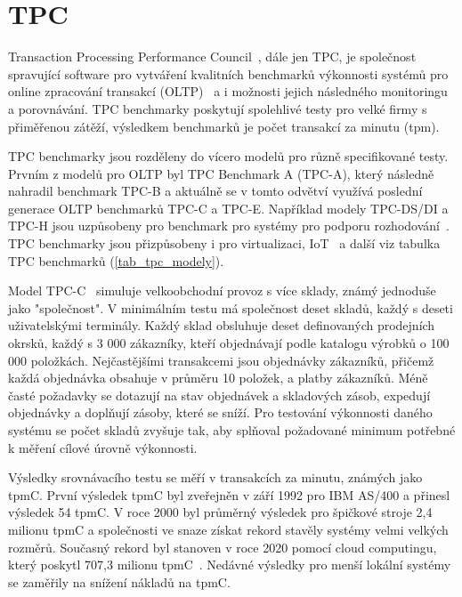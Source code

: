 \documentclass[czech,master,dept460,male,csharp,cpdeclaration]{diploma}
\begin{document}
	\section{TPC}
	
	Transaction Processing Performance Council~\cite{tpc}, dále jen TPC, je společnost spravující software pro vytváření kvalitních benchmarků výkonnosti systémů pro online zpracování transakcí (OLTP)~\cite{oltp} a i možnosti jejich následného monitoringu a porovnávání. TPC benchmarky poskytují spolehlivé testy pro velké firmy s přiměřenou zátěží, výsledkem benchmarků je počet transakcí za minutu (tpm).
	
	TPC benchmarky jsou rozděleny do vícero modelů pro různě specifikované testy. Prvním z modelů pro OLTP byl TPC Benchmark A (TPC-A), který následně nahradil benchmark TPC-B a aktuálně se v tomto odvětví využívá poslední generace OLTP benchmarků TPC-C a TPC-E. Například modely TPC-DS/DI a TPC-H jsou uzpůsobeny pro benchmark pro systémy pro podporu rozhodování~\cite{dss}. TPC benchmarky jsou přizpůsobeny i pro virtualizaci, IoT~\cite{iot} a další viz tabulka TPC benchmarků (\ref{tab_tpc_modely}).
	
	Model TPC-C~\cite{tpc-c} simuluje velkoobchodní provoz s více sklady, známý jednoduše jako "společnost". V minimálním testu má společnost deset skladů, každý s deseti uživatelskými terminály. Každý sklad obsluhuje deset definovaných prodejních okrsků, každý s 3 000 zákazníky, kteří objednávají podle katalogu výrobků o 100 000 položkách. Nejčastějšími transakcemi jsou objednávky zákazníků, přičemž každá objednávka obsahuje v průměru 10 položek, a platby zákazníků. Méně časté požadavky se dotazují na stav objednávek a skladových zásob, expedují objednávky a doplňují zásoby, které se sníží. Pro testování výkonnosti daného systému se počet skladů zvyšuje tak, aby splňoval požadované minimum potřebné k měření cílové úrovně výkonnosti.
	
	Výsledky srovnávacího testu se měří v transakcích za minutu, známých jako tpmC. První výsledek tpmC byl zveřejněn v září 1992 pro IBM AS/400 a přinesl výsledek 54 tpmC. V roce 2000 byl průměrný výsledek pro špičkové stroje 2,4 milionu tpmC a společnosti ve snaze získat rekord stavěly systémy velmi velkých rozměrů. Současný rekord byl stanoven v roce 2020 pomocí cloud computingu, který poskytl 707,3 milionu tpmC~\cite{tpc-c-top-result}. Nedávné výsledky pro menší lokální systémy se zaměřily na snížení nákladů na tpmC.
	
\end{document}
